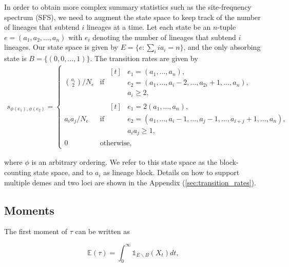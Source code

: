 \documentclass[hidelinks,11pt]{article}
\begin{document}
    In order to obtain more complex summary statistics such as the site-frequency spectrum (SFS), we need to augment the state space to keep track of the number of lineages that subtend $i$ lineages at a time.
    Let each state be an $n$-tuple $e=(a_1, a_2, \dots, a_n)$ with $e_i$ denoting the number of lineages that subtend $i$ lineages.
    Our state space is given by $E=\{e: \sum_i ia_i = n\}$, and the only absorbing state is $B=\{(0, 0, ..., 1)\}$.
    The transition rates are given by~\citep{phasetype_popgen}
    \begin{align*}
        s_{\phi(e_1),\phi(e_2)} =
        \begin{cases}
            \binom{a_i}{2} / N_e & \text{if }
            \begin{aligned}[t]
                & e_1=(a_1,\dots,a_n), \\
                & e_2=(a_1,\dots,a_i-2,\dots,a_{2i}+1,\dots,a_{n}), \\
                & a_i \geq 2,
            \end{aligned} \\
            a_i a_j / N_e & \text{if }
            \begin{aligned}[t]
                & e_1=2(a_1,\dots,a_n), \\
                & e_2=(a_1,\dots,a_i-1,\dots,a_j-1,\dots,a_{i+j}+1,\dots,a_{n}), \\
                & a_i a_j \geq 1,
            \end{aligned} \\
            0 & \text{otherwise,}
        \end{cases}
    \end{align*}

    where $\phi$ is an arbitrary ordering.
    We refer to this state space as the block-counting state space, and to $a_i$ as lineage block.
    Details on how to support multiple demes and two loci are shown in the Appendix (\ref{sec:transition_rates}).

    \subsection{Moments}\label{subsec:moments}

    The first moment of $\tau$ can be written as

    \begin{equation*}
        \mathds{E}(\tau) = \int_0^{\infty} \mathds{1}_{E \backslash B}(X_t) dt,
    \end{equation*}
\end{document}

